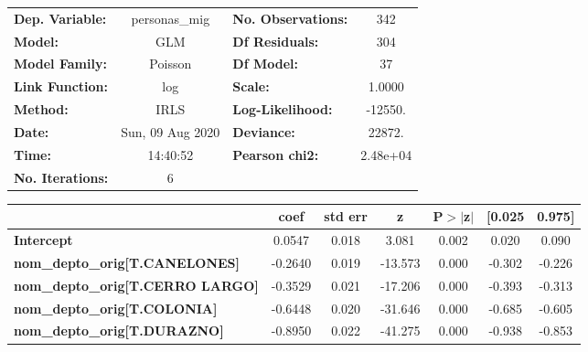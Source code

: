 \begin{center}
\begin{tabular}{lclc}
\toprule
\textbf{Dep. Variable:}                     &  personas\_mig   & \textbf{  No. Observations:  } &      342    \\
\textbf{Model:}                             &       GLM        & \textbf{  Df Residuals:      } &      304    \\
\textbf{Model Family:}                      &     Poisson      & \textbf{  Df Model:          } &       37    \\
\textbf{Link Function:}                     &       log        & \textbf{  Scale:             } &    1.0000   \\
\textbf{Method:}                            &       IRLS       & \textbf{  Log-Likelihood:    } &   -12550.   \\
\textbf{Date:}                              & Sun, 09 Aug 2020 & \textbf{  Deviance:          } &    22872.   \\
\textbf{Time:}                              &     14:40:52     & \textbf{  Pearson chi2:      } &  2.48e+04   \\
\textbf{No. Iterations:}                    &        6         & \textbf{                     } &             \\
\bottomrule
\end{tabular}
\begin{tabular}{lcccccc}
                                            & \textbf{coef} & \textbf{std err} & \textbf{z} & \textbf{P$> |$z$|$} & \textbf{[0.025} & \textbf{0.975]}  \\
\midrule
\textbf{Intercept}                          &       0.0547  &        0.018     &     3.081  &         0.002        &        0.020    &        0.090     \\
\textbf{nom\_depto\_orig[T.CANELONES]}      &      -0.2640  &        0.019     &   -13.573  &         0.000        &       -0.302    &       -0.226     \\
\textbf{nom\_depto\_orig[T.CERRO LARGO]}    &      -0.3529  &        0.021     &   -17.206  &         0.000        &       -0.393    &       -0.313     \\
\textbf{nom\_depto\_orig[T.COLONIA]}        &      -0.6448  &        0.020     &   -31.646  &         0.000        &       -0.685    &       -0.605     \\
\textbf{nom\_depto\_orig[T.DURAZNO]}        &      -0.8950  &        0.022     &   -41.275  &         0.000        &       -0.938    &       -0.853     \\

\end{tabular}
\end{center}
